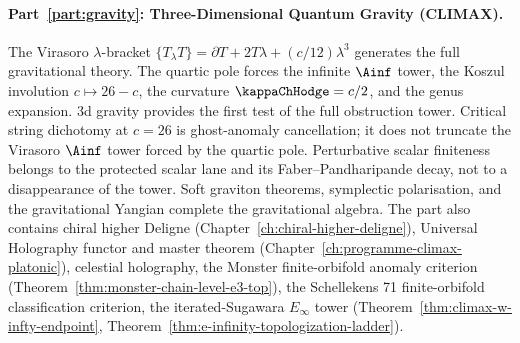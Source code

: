 \paragraph{Part~\ref{part:gravity}: Three-Dimensional Quantum
Gravity (CLIMAX).}
The Virasoro $\lambda$-bracket
$\{T_\lambda T\} = \partial T + 2T\lambda + (c/12)\lambda^3$
generates the full gravitational theory. The quartic pole forces
the infinite $\Ainf$ tower, the Koszul involution
$c \mapsto 26 - c$, the curvature $\kappaChHodge = c/2$, and
the genus expansion. 3d gravity provides the first test of the
full obstruction tower. Critical string dichotomy at $c = 26$ is
ghost-anomaly cancellation; it does not truncate the Virasoro
$\Ainf$ tower forced by the quartic pole. Perturbative scalar
finiteness belongs to the protected scalar lane and its
Faber--Pandharipande decay, not to a disappearance of the tower.
Soft graviton theorems, symplectic polarisation, and the
gravitational Yangian complete the gravitational algebra.
The part also contains chiral higher Deligne
(Chapter~\ref{ch:chiral-higher-deligne}), Universal Holography
functor and master theorem (Chapter~\ref{ch:programme-climax-platonic}),
celestial holography, the Monster finite-orbifold anomaly criterion
(Theorem~\ref{thm:monster-chain-level-e3-top}), the Schellekens
71 finite-orbifold classification criterion, the iterated-Sugawara
$E_\infty$ tower (Theorem~\ref{thm:climax-w-infty-endpoint},
Theorem~\ref{thm:e-infinity-topologization-ladder}).

